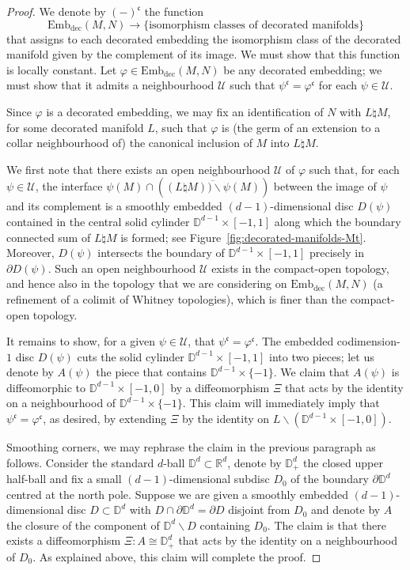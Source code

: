 \documentclass[10pt,a4paper]{amsart}
\numberwithin{equation}{section}
\newcommand{\rdec}{\mathrm{dec}}
\newcommand{\fkc}{\mathfrak{c}}
\newcommand{\cU}{\mathcal{U}}
\newcommand{\bD}{\mathbb{D}}
\newcommand{\bR}{\mathbb{R}}
\newcommand{\too}{\ensuremath{\longrightarrow}}
\newcommand{\embdec}{\ensuremath{\mathrm{Emb}_{\rdec}}}
\theoremstyle{definition}
\theoremstyle{remark}
\begin{document}
\begin{proof}
We denote by $(-)^{\fkc}$ the function
\[
\embdec(M,N) \too \{ \text{isomorphism classes of decorated manifolds} \}
\]
that assigns to each decorated embedding the isomorphism class of the decorated manifold given by the complement of its image. We must show that this function is locally constant. Let $\varphi \in \embdec(M,N)$ be any decorated embedding; we must show that it admits a neighbourhood $\cU$ such that $\psi^{\fkc} = \varphi^{\fkc}$ for each $\psi \in \cU$.

Since $\varphi$ is a decorated embedding, we may fix an identification of $N$ with $L \natural M$, for some decorated manifold $L$, such that $\varphi$ is (the germ of an extension to a collar neighbourhood of) the canonical inclusion of $M$ into $L \natural M$.

We first note that there exists an open neighbourhood $\cU$ of $\varphi$ such that, for each $\psi \in \cU$, the interface $\psi(M) \cap (\overline{(L \natural M)) \smallsetminus \psi(M)})$ between the image of $\psi$ and its complement is a smoothly embedded $(d-1)$-dimensional disc $D(\psi)$ contained in the central solid cylinder $\bD^{d-1} \times [-1,1]$ along which the boundary connected sum of $L \natural M$ is formed; see Figure~\ref{fig:decorated-manifolds-Mt}. Moreover, $D(\psi)$ intersects the boundary of $\bD^{d-1} \times [-1,1]$ precisely in $\partial D(\psi)$. Such an open neighbourhood $\cU$ exists in the compact-open topology, and hence also in the topology that we are considering on $\embdec(M,N)$ (a refinement of a colimit of Whitney topologies), which is finer than the compact-open topology.

It remains to show, for a given $\psi \in \cU$, that $\psi^{\fkc} = \varphi^{\fkc}$. The embedded codimension-$1$ disc $D(\psi)$ cuts the solid cylinder $\bD^{d-1} \times [-1,1]$ into two pieces; let us denote by $A(\psi)$ the piece that contains $\bD^{d-1} \times \{-1\}$. We claim that $A(\psi)$ is diffeomorphic to $\bD^{d-1} \times [-1,0]$ by a diffeomorphism $\Xi$ that acts by the identity on a neighbourhood of $\bD^{d-1} \times \{-1\}$. This claim will immediately imply that $\psi^{\fkc} = \varphi^{\fkc}$, as desired, by extending $\Xi$ by the identity on $L \smallsetminus (\bD^{d-1} \times [-1,0])$.

Smoothing corners, we may rephrase the claim in the previous paragraph as follows. Consider the standard $d$-ball $\bD^d \subset \bR^d$, denote by $\bD^d_+$ the closed upper half-ball and fix a small $(d-1)$-dimensional subdisc $D_0$ of the boundary $\partial \bD^d$ centred at the north pole. Suppose we are given a smoothly embedded $(d-1)$-dimensional disc $D \subset \bD^d$ with $D \cap \partial \bD^d = \partial D$ disjoint from $D_0$ and denote by $A$ the closure of the component of $\bD^d \smallsetminus D$ containing $D_0$. The claim is that there exists a diffeomorphism $\Xi \colon A \cong \bD^d_+$ that acts by the identity on a neighbourhood of $D_0$. As explained above, this claim will complete the proof.


\end{proof}
\end{document}
